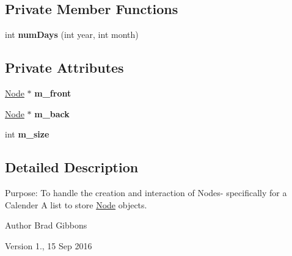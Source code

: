 \subsection*{Private Member Functions}
\begin{DoxyCompactItemize}
\item 
\hypertarget{classDoubleLinkedList_acfaca6e090facfa960eaf5bc17c57881}{int {\bfseries num\-Days} (int year, int month)}\label{classDoubleLinkedList_acfaca6e090facfa960eaf5bc17c57881}

\end{DoxyCompactItemize}
\subsection*{Private Attributes}
\begin{DoxyCompactItemize}
\item 
\hypertarget{classDoubleLinkedList_aebad69b8d0982620276e5a15b5a9ff52}{\hyperlink{classNode}{Node} $\ast$ {\bfseries m\-\_\-front}}\label{classDoubleLinkedList_aebad69b8d0982620276e5a15b5a9ff52}

\item 
\hypertarget{classDoubleLinkedList_acb0174fc3f1edbb2d320e779514f262d}{\hyperlink{classNode}{Node} $\ast$ {\bfseries m\-\_\-back}}\label{classDoubleLinkedList_acb0174fc3f1edbb2d320e779514f262d}

\item 
\hypertarget{classDoubleLinkedList_a9ca1b294d84734492d25402f2c6967ce}{int {\bfseries m\-\_\-size}}\label{classDoubleLinkedList_a9ca1b294d84734492d25402f2c6967ce}

\end{DoxyCompactItemize}


\subsection{Detailed Description}
Purpose\-: To handle the creation and interaction of Nodes-\/ specifically for a Calender A list to store \hyperlink{classNode}{Node} objects. \begin{DoxyAuthor}{Author}
Brad Gibbons 
\end{DoxyAuthor}
\begin{DoxyVersion}{Version}
1., 15 Sep 2016 
\end{DoxyVersion}


